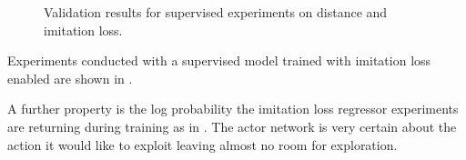 \begin{figure}
    \begin{center}
        \hfill
    \end{center}
    \caption[Supervised Distance and Imitation Loss]{Validation results for supervised experiments on distance and imitation loss. }
    \label{fig:sac_supervised_imitation}
\end{figure}

Experiments conducted with a supervised model trained with imitation loss enabled are shown in .

A further property is the log probability the imitation loss regressor experiments are returning during training as in . The actor network is very certain about the action it would like to exploit leaving almost no room for exploration. 

